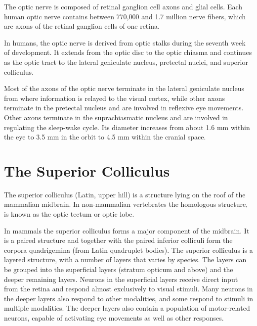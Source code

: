 The optic nerve is composed of retinal ganglion cell axons and glial cells. Each human optic nerve contains between 770,000 and 1.7 million nerve fibers, which are axons of the retinal ganglion cells of one retina.

In humans, the optic nerve is derived from optic stalks during the seventh week of development. It extends from the optic disc to the optic chiasma and continues as the optic tract to the lateral geniculate nucleus, pretectal nuclei, and superior colliculus.

Most of the axons of the optic nerve terminate in the lateral geniculate nucleus from where information is relayed to the visual cortex, while other axons terminate in the pretectal nucleus and are involved in reflexive eye movements. Other axons terminate in the suprachiasmatic nucleus and are involved in regulating the sleep-wake cycle. Its diameter increases from about 1.6 mm within the eye to 3.5 mm in the orbit to 4.5 mm within the cranial space.

\hypertarget{the-superior-colliculus}{%
\section{The Superior Colliculus}\label{the-superior-colliculus}}

The superior colliculus (Latin, upper hill) is a structure lying on the roof of the mammalian midbrain. In non-mammalian vertebrates the homologous structure, is known as the optic tectum or optic lobe.

In mammals the superior colliculus forms a major component of the midbrain. It is a paired structure and together with the paired inferior colliculi form the corpora quadrigemina (from Latin quadruplet bodies). The superior colliculus is a layered structure, with a number of layers that varies by species. The layers can be grouped into the superficial layers (stratum opticum and above) and the deeper remaining layers. Neurons in the superficial layers receive direct input from the retina and respond almost exclusively to visual stimuli. Many neurons in the deeper layers also respond to other modalities, and some respond to stimuli in multiple modalities. The deeper layers also contain a population of motor-related neurons, capable of activating eye movements as well as other responses.

